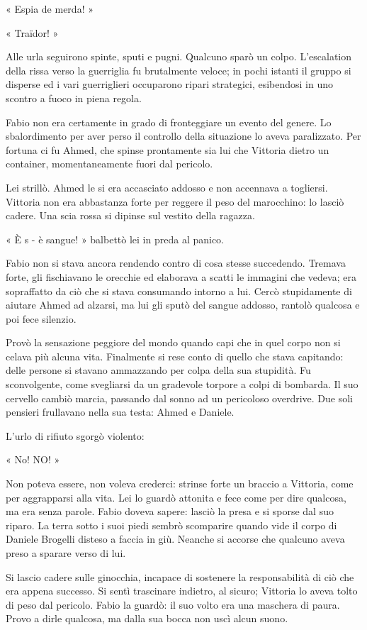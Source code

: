 « Espia de merda! »

« Traïdor! »

Alle urla seguirono spinte, sputi e pugni. Qualcuno sparò un colpo. L'escalation della rissa verso la guerriglia fu brutalmente veloce; in pochi istanti il gruppo si disperse ed i vari guerriglieri occuparono ripari strategici, esibendosi in uno scontro a fuoco in piena regola.

Fabio non era certamente in grado di fronteggiare un evento del genere. Lo sbalordimento per aver perso il controllo della situazione lo aveva paralizzato. Per fortuna ci fu Ahmed, che spinse prontamente sia lui che Vittoria dietro un container, momentaneamente fuori dal pericolo.

Lei strillò. Ahmed le si era accasciato addosso e non accennava a togliersi. Vittoria non era abbastanza forte per reggere il peso del marocchino: lo lasciò cadere. Una scia rossa si dipinse sul vestito della ragazza.

« È s - è sangue! » balbettò lei in preda al panico.

Fabio non si stava ancora rendendo contro di cosa stesse succedendo. Tremava forte, gli fischiavano le orecchie ed elaborava a scatti le immagini che vedeva; era sopraffatto da ciò che si stava consumando intorno a lui. Cercò stupidamente di aiutare Ahmed ad alzarsi, ma lui gli sputò del sangue addosso, rantolò qualcosa e poi fece silenzio.

Provò la sensazione peggiore del mondo quando capi che in quel corpo non si celava più alcuna vita. Finalmente si rese conto di quello che stava capitando: delle persone si stavano ammazzando per colpa della sua stupidità. Fu sconvolgente, come svegliarsi da un gradevole torpore a colpi di bombarda. Il suo cervello cambiò marcia, passando dal sonno ad un pericoloso overdrive. Due soli pensieri frullavano nella sua testa: Ahmed e Daniele.

L'urlo di rifiuto sgorgò violento:

« No! NO! »

Non poteva essere, non voleva crederci: strinse forte un braccio a Vittoria, come per aggrapparsi alla vita. Lei lo guardò attonita e fece come per dire qualcosa, ma era senza parole. Fabio doveva sapere: lasciò la presa e si sporse dal suo riparo. La terra sotto i suoi piedi sembrò scomparire quando vide il corpo di Daniele Brogelli disteso a faccia in giù. Neanche si accorse che qualcuno aveva preso a sparare verso di lui.

Si lascio cadere sulle ginocchia, incapace di sostenere la responsabilità di ciò che era appena successo. Si sentì trascinare indietro, al sicuro; Vittoria lo aveva tolto di peso dal pericolo. Fabio la guardò: il suo volto era una maschera di paura. Provo a dirle qualcosa, ma dalla sua bocca non uscì alcun suono.

